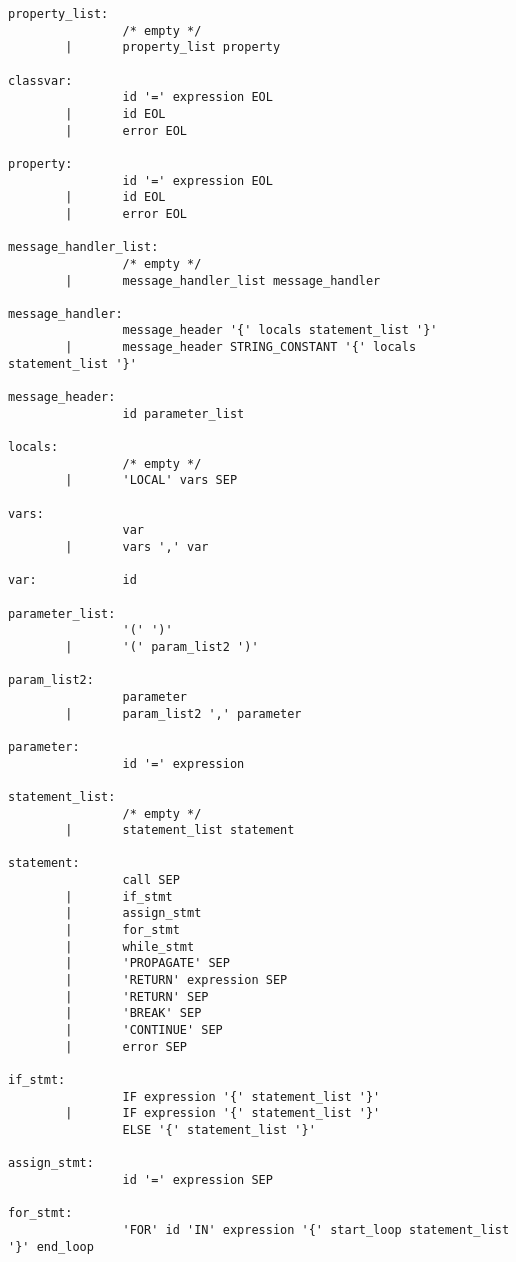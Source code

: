 \begin{verbatim}
property_list:
                /* empty */                
        |       property_list property         

classvar:
                id '=' expression EOL        
        |       id EOL                        
        |       error EOL                

property:
                id '=' expression EOL        
        |       id EOL                        
        |       error EOL                

message_handler_list:
                /* empty */                                
        |       message_handler_list message_handler        

message_handler:
                message_header '{' locals statement_list '}'
        |       message_header STRING_CONSTANT '{' locals statement_list '}'

message_header:
                id parameter_list

locals:
                /* empty */        
        |       'LOCAL' vars SEP  

vars:
                var                
        |       vars ',' var        

var:            id                

parameter_list:
                '(' ')'                        
        |       '(' param_list2 ')'         

param_list2:
                parameter                        
        |       param_list2 ',' parameter        

parameter:
                id '=' expression        

statement_list:
                /* empty */        
        |       statement_list statement         

statement: 
                call SEP        
        |       if_stmt                
        |       assign_stmt        
        |       for_stmt        
        |       while_stmt        
        |       'PROPAGATE' SEP        
        |       'RETURN' expression SEP
        |       'RETURN' SEP
        |       'BREAK' SEP
        |       'CONTINUE' SEP
        |       error SEP

if_stmt:
                IF expression '{' statement_list '}'
        |       IF expression '{' statement_list '}'  
                ELSE '{' statement_list '}' 

assign_stmt:
                id '=' expression SEP

for_stmt:
                'FOR' id 'IN' expression '{' start_loop statement_list '}' end_loop


\end{verbatim}
